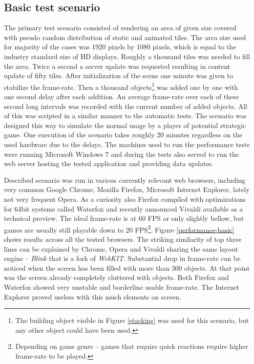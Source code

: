 \documentclass[11pt,oneside, final]{fithesis2}
\begin{document}
\subsection{Basic test scenario}
The primary test scenario consisted of rendering an area of given size covered with pseudo random distribution of static and animated tiles. The area size used for majority of the cases was 1920 pixels by 1080 pixels, which is equal to the industry standard size of HD displays. Roughly a thousand tiles was needed to fill the area. Twice a second a server update was requested resulting in content update of fifty tiles. After initialization of the scene one minute was given to stabilize the frame-rate. Then a thousand objects\footnote{The building object visible in Figure \ref{stacking} was used for this scenario, but any other object could have been used.} was added one by one with one second delay after each addition. An average frame-rate over each of these second long intervals was recorded with the current number of added objects. All of this was scripted in a similar manner to the automatic tests. The scenario was designed this way to simulate the normal usage by a player of potential strategic game. One execution of the scenario takes roughly 20 minutes regardless on the used hardware due to the delays. The machines used to run the performance tests were running Microsoft Windows 7 and during the tests also served to run the web server hosting the tested application and providing data updates.

Described scenario was run in various currently relevant web browsers, including very common Google Chrome, Mozilla Firefox, Microsoft Internet Explorer, lately not very frequent Opera. As a curiosity also Firefox compiled with optimizations for 64bit systems called Waterfox\cite{waterfox} and recently announced Vivaldi available as a technical preview\cite{vivaldi}. The ideal frame-rate is at 60 FPS or only slightly bellow, but games are usually still playable down to 20 FPS\footnote{Depending on game genre -- games that require quick reactions require higher frame-rate to be played.}. Figure \ref{performance-basic} shows results across all the tested browsers. The striking similarity of top three lines can be explained by Chrome, Opera and Vivaldi sharing the same layout engine -- \emph{Blink} that is a fork of \emph{WebKIT}\cite{webkit}. Substantial drop in frame-rate can be noticed when the screen has been filled with more than 300 objects. At that point was the screen already completely cluttered with objects. Both Firefox and Waterfox showed very unstable and borderline usable frame-rate. The Internet Explorer proved useless with this much elements on screen.
\end{document}
